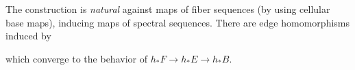 \begin{remark}\label{EdgeHomDefn}
The construction is \emph{natural} against maps of fiber sequences (by using cellular base maps), inducing maps of spectral sequences.
There are edge homomorphisms induced by
\begin{center}
\end{center}
which converge to the behavior of $h_* F \to h_* E \to h_* B$.
\end{remark}


